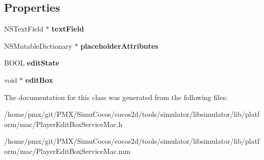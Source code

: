 \subsection*{Properties}
\begin{DoxyCompactItemize}
\item 
\mbox{\label{interfaceEditBoxServiceImplMac_a65b8ef561f28bf5a4db9f62443b1e85b}} 
N\+S\+Text\+Field $\ast$ {\bfseries text\+Field}
\item 
\mbox{\label{interfaceEditBoxServiceImplMac_a78d9c5ce29f43a517993a9c91111837a}} 
N\+S\+Mutable\+Dictionary $\ast$ {\bfseries placeholder\+Attributes}
\item 
\mbox{\label{interfaceEditBoxServiceImplMac_aba6b597e404c4f13bd2c6763bded8a21}} 
B\+O\+OL {\bfseries edit\+State}
\item 
\mbox{\label{interfaceEditBoxServiceImplMac_acb6af3cd4f9488cb7157c09dddcdea09}} 
void $\ast$ {\bfseries edit\+Box}
\end{DoxyCompactItemize}


The documentation for this class was generated from the following files\+:\begin{DoxyCompactItemize}
\item 
/home/pmx/git/\+P\+M\+X/\+Simu\+Cocos/cocos2d/tools/simulator/libsimulator/lib/platform/mac/Player\+Edit\+Box\+Service\+Mac.\+h\item 
/home/pmx/git/\+P\+M\+X/\+Simu\+Cocos/cocos2d/tools/simulator/libsimulator/lib/platform/mac/Player\+Edit\+Box\+Service\+Mac.\+mm\end{DoxyCompactItemize}
